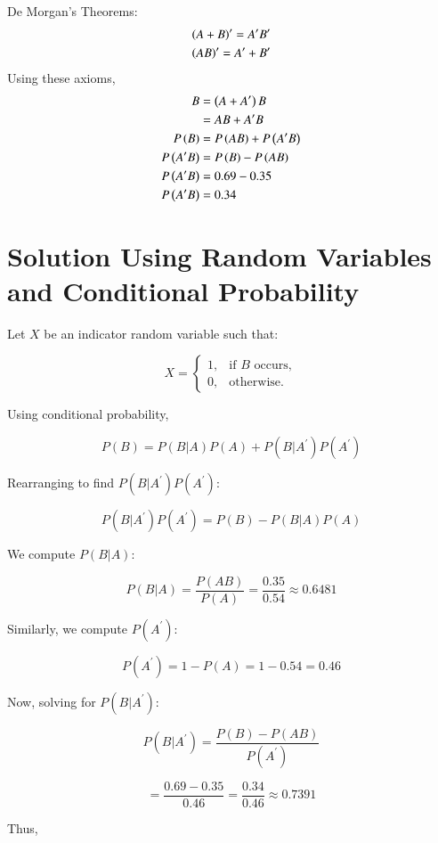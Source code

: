 \documentclass[journal]{IEEEtran}
\begin{document}
De Morgan's Theorems:
\begin{align}
    \left(A + B\right)^\prime  = A^\prime  B^\prime  \label{eq:dm1} \\
    \left(AB\right)^\prime  = A^\prime  + B^\prime  \label{eq:dm2}
\end{align}
Using these axioms,
\begin{align}
B &=\left(A+A^\prime \right)B \\
    &= AB + A^\prime  B \label{eq:B}\\
    P\left(B\right) &= P\left(AB\right) + P\left(A^\prime B\right)\\
    P\left(A^\prime B\right) &= P\left(B\right) - P\left(AB\right)\\
    P\left(A^\prime B\right) &= 0.69 - 0.35 \\
    P\left(A^\prime B\right) &= 0.34
\end{align}



\section{Solution Using Random Variables and Conditional Probability}

Let \( X \) be an indicator random variable such that:

\[
X =
\begin{cases}
1, & \text{if } B \text{ occurs}, \\
0, & \text{otherwise}.
\end{cases}
\]

Using conditional probability,

\[
P(B) = P(B | A) P(A) + P(B | A^\prime) P(A^\prime)
\]

Rearranging to find \( P(B | A^\prime) P(A^\prime) \):

\[
P(B | A^\prime) P(A^\prime) = P(B) - P(B | A) P(A)
\]

We compute \( P(B | A) \):

\[
P(B | A) = \frac{P(A  B)}{P(A)} = \frac{0.35}{0.54} \approx 0.6481
\]

Similarly, we compute \( P(A^\prime) \):

\[
P(A^\prime) = 1 - P(A) = 1 - 0.54 = 0.46
\]

Now, solving for \( P(B | A^\prime) \):

\[
P(B | A^\prime) = \frac{P(B) - P(A  B)}{P(A^\prime)}
\]

\[
= \frac{0.69 - 0.35}{0.46} = \frac{0.34}{0.46} \approx 0.7391
\]

Thus,
\end{document}
